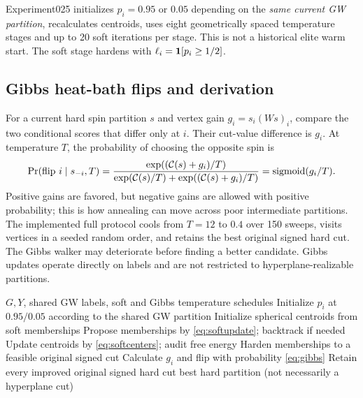 Experiment025 initializes $p_i=0.95$ or $0.05$ depending on the \emph{same current GW partition}, recalculates centroids, uses eight geometrically spaced temperature stages and up to 20 soft iterations per stage. This is not a historical elite warm start. The soft stage hardens with $\ell_i=\mathbf{1}[p_i\ge1/2]$.

\subsection{Gibbs heat-bath flips and derivation}
For a current hard spin partition $s$ and vertex gain $g_i=s_i(Ws)_i$, compare the two conditional scores that differ only at $i$. Their cut-value difference is $g_i$. At temperature $T$, the probability of choosing the opposite spin is
\begin{equation}\label{eq:gibbs}
\Pr(\mathrm{flip}\ i\mid s_{-i},T)
=\frac{\exp((\mathcal{C}(s)+g_i)/T)}
{\exp(\mathcal{C}(s)/T)+\exp((\mathcal{C}(s)+g_i)/T)}
=\operatorname{sigmoid}(g_i/T).
\end{equation}
Positive gains are favored, but negative gains are allowed with positive probability; this is how annealing can move across poor intermediate partitions. The implemented full protocol cools from $T=12$ to $0.4$ over 150 sweeps, visits vertices in a seeded random order, and retains the best original signed hard cut. The Gibbs walker may deteriorate before finding a better candidate. Gibbs updates operate directly on labels and are not restricted to hyperplane-realizable partitions.

\begin{algorithm}[tb]
\caption{EM--Gibbs before the common postprocessor}\label{alg:gibbs}
\begin{algorithmic}[1]
\Require $G,Y$, shared GW labels, soft and Gibbs temperature schedules
\State Initialize $p_i$ at $0.95/0.05$ according to the shared GW partition
\State Initialize spherical centroids from soft memberships
  \State Propose memberships by \eqref{eq:softupdate}; backtrack if needed
  \State Update centroids by \eqref{eq:softcenters}; audit free energy
 \EndFor
\EndFor
\State Harden memberships to a feasible original signed cut
  \State Calculate $g_i$ and flip with probability \eqref{eq:gibbs}
  \State Retain every improved original signed hard cut
 \EndFor
\EndFor
\State \Return best hard partition (not necessarily a hyperplane cut)
\end{algorithmic}
\end{algorithm}


